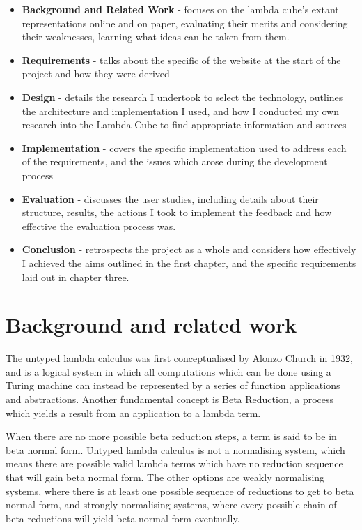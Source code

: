 \documentclass{l4proj}
\begin{document}
\begin{itemize}
    \item
    \textbf{Background and Related Work} - focuses on the lambda cube's extant representations online and on paper,  evaluating their merits and considering their weaknesses, learning what ideas can be taken from them.
    \item
    \textbf{Requirements} - talks about the specific  of the website at the start of the project and how they were derived
    \item
    \textbf{Design} - details the research I undertook to select the technology, outlines the architecture and implementation I used, and how I conducted my own research into the Lambda Cube to find appropriate information and sources
    \item
    \textbf{Implementation} - covers the specific implementation used to address each of the requirements, and the issues which arose during the development process
    \item
    \textbf{Evaluation} - discusses the user studies, including details about their structure, results, the actions I took to implement the feedback and how effective the evaluation process was.
    \item
    \textbf{Conclusion} - retrospects the project as a whole and considers how effectively I achieved the aims outlined in the first chapter, and the specific requirements laid out in chapter three.
    
\end{itemize}

\chapter{Background and related work}

The untyped lambda calculus was first conceptualised by Alonzo Church in 1932, and is a logical system in which all computations which can be done using a Turing machine can instead be represented by a series of function applications and abstractions.  Another fundamental concept is Beta Reduction, a process which yields a result from an application to a lambda term. 

When there are no more possible beta reduction steps, a term is said to be in beta normal form.  Untyped lambda calculus is not a normalising system, which means there are possible valid lambda terms which have no reduction sequence that will gain beta normal form.  The other options are weakly normalising systems, where there is at least one possible sequence of reductions to get to beta normal form, and strongly normalising systems, where every possible chain of beta reductions will yield beta normal form eventually.
\end{document}
